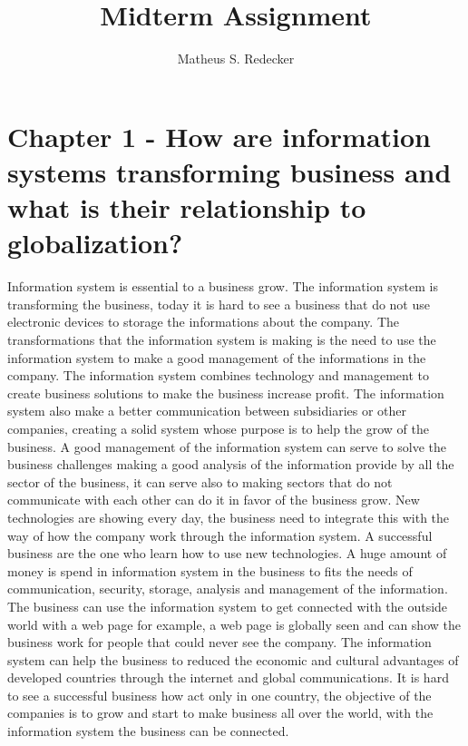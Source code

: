 \documentclass[12pt]{article}
\title{Midterm Assignment}
\author{Matheus S. Redecker\inst{1} }
\begin{document}
 

\maketitle

\section{Chapter 1 - How are information systems transforming business and what is their relationship to globalization?}
Information system is  essential to a business grow. The information system is transforming the business, today it is hard to see a business that do not use electronic devices to storage the informations about the company. The transformations that the information system is making is the need to use the information system to make a good management of the informations in the company. The information system combines technology and management to create business solutions to make the business increase profit. The information system also make a better communication between subsidiaries or other companies, creating a solid system whose purpose is to help the grow of the business. A good management of the information system can serve to solve the business challenges making a good analysis of the information provide by all the sector of the business, it can serve also to making sectors that do not communicate with each other can do it in favor of the business grow. New technologies are showing every day, the business need to integrate this with the way of how the company work through the information system. A successful business are the one who learn how to use new technologies. A huge amount of money is spend in information system in the business to fits the needs of communication, security, storage, analysis and management of the information. The business can use the information system to get connected with the outside world with a web page for example, a web page is globally seen and can show the business work for people that could never see the company. The information system can help the business to reduced the economic and cultural advantages of developed countries through the internet and global communications. It is hard to see a successful business how act only in one country, the objective of the companies is to grow and start to make business all over the world, with the information system the business can be connected.  
\end{document}
